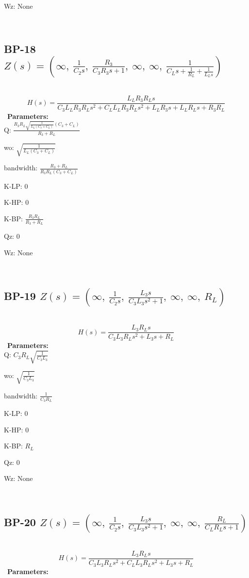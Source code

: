 \documentclass{article}
\begin{document}
Wz: $\text{None}$\ 

\ 

\subsection{BP-18 $Z(s) = \left( \infty, \  \frac{1}{C_{2} s}, \  \frac{R_{3}}{C_{3} R_{3} s + 1}, \  \infty, \  \infty, \  \frac{1}{C_{L} s + \frac{1}{R_{L}} + \frac{1}{L_{L} s}}\right)$ } \ 
\textbf{\[H(s) = \frac{L_{L} R_{3} R_{L} s}{C_{3} L_{L} R_{3} R_{L} s^{2} + C_{L} L_{L} R_{3} R_{L} s^{2} + L_{L} R_{3} s + L_{L} R_{L} s + R_{3} R_{L}}\] } \ 
\textbf{Parameters:}\\ 

Q: $\frac{R_{3} R_{L} \sqrt{\frac{1}{L_{L} \left(C_{3} + C_{L}\right)}} \left(C_{3} + C_{L}\right)}{R_{3} + R_{L}}$\ 

wo: $\sqrt{\frac{1}{L_{L} \left(C_{3} + C_{L}\right)}}$\ 

bandwidth: $\frac{R_{3} + R_{L}}{R_{3} R_{L} \left(C_{3} + C_{L}\right)}$\ 

K-LP: $0$\ 

K-HP: $0$\ 

K-BP: $\frac{R_{3} R_{L}}{R_{3} + R_{L}}$\ 

Qz: $0$\ 

Wz: $\text{None}$\ 

\ 

\subsection{BP-19 $Z(s) = \left( \infty, \  \frac{1}{C_{2} s}, \  \frac{L_{3} s}{C_{3} L_{3} s^{2} + 1}, \  \infty, \  \infty, \  R_{L}\right)$ } \ 
\textbf{\[H(s) = \frac{L_{3} R_{L} s}{C_{3} L_{3} R_{L} s^{2} + L_{3} s + R_{L}}\] } \ 
\textbf{Parameters:}\\ 

Q: $C_{3} R_{L} \sqrt{\frac{1}{C_{3} L_{3}}}$\ 

wo: $\sqrt{\frac{1}{C_{3} L_{3}}}$\ 

bandwidth: $\frac{1}{C_{3} R_{L}}$\ 

K-LP: $0$\ 

K-HP: $0$\ 

K-BP: $R_{L}$\ 

Qz: $0$\ 

Wz: $\text{None}$\ 

\ 

\subsection{BP-20 $Z(s) = \left( \infty, \  \frac{1}{C_{2} s}, \  \frac{L_{3} s}{C_{3} L_{3} s^{2} + 1}, \  \infty, \  \infty, \  \frac{R_{L}}{C_{L} R_{L} s + 1}\right)$ } \ 
\textbf{\[H(s) = \frac{L_{3} R_{L} s}{C_{3} L_{3} R_{L} s^{2} + C_{L} L_{3} R_{L} s^{2} + L_{3} s + R_{L}}\] } \ 
\textbf{Parameters:}\\ 
\end{document}
